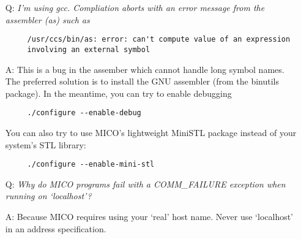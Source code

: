 \begin{itemize}
\item[Q:] \emph{I'm using gcc. Compliation aborts with an error message
  from the assembler (as) such as}
  \begin{verbatim}
     /usr/ccs/bin/as: error: can't compute value of an expression
     involving an external symbol
  \end{verbatim}

\item[A:] This is a bug in the assember which cannot handle long symbol
  names. The preferred solution is to install the GNU assembler (from the
  binutils package). In the meantime, you can try to enable debugging

  \begin{verbatim}
     ./configure --enable-debug
  \end{verbatim}

  You can also try to use MICO's lightweight MiniSTL package instead of
  your system's STL library:

  \begin{verbatim}
     ./configure --enable-mini-stl
  \end{verbatim}
\end{itemize}

\begin{itemize}
\item[Q:] \emph{Why do MICO programs fail with a COMM\_FAILURE
    exception when running on `localhost'?}
\item[A:] Because MICO requires using your `real' host name. Never use
    `localhost' in an address specification.
\end{itemize}

